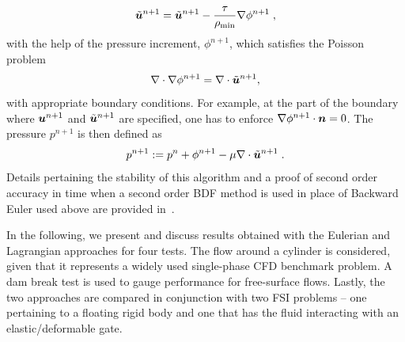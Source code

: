 \begin{align*}
\tilde{\boldsymbol{u}}^{n+1} = \tilde{\boldsymbol{u}}^{n+1} - \frac{\tau}{\rho_{\min}}\nabla\phi^{n+1} \; ,
\end{align*}
with the help of the pressure increment, $\phi^{n+1}$, which satisfies the Poisson problem 
\begin{align*}
\nabla\cdot\nabla\phi^{n+1} = \nabla\cdot\tilde{\boldsymbol{u}}^{n+1} ,
\end{align*}
with appropriate boundary conditions. For example, at the part of the boundary where $\boldsymbol{u}^{n+1}$ and 
$\tilde{\boldsymbol{u}}^{n+1}$ are specified, one has to enforce $\nabla\phi^{n+1}\cdot\boldsymbol{n}=0$.
The pressure $p^{n+1}$ is then defined as 
\begin{align*}
p^{n+1} := p^n + \phi^{n+1} - \mu \nabla\cdot\tilde{\boldsymbol{u}}^{n+1} \; .
\end{align*}
Details pertaining the stability of this algorithm and a proof of second order accuracy in time when a second order BDF method is used in place of Backward
Euler used above are provided in~\cite{GS09}. 

In the following, we present and discuss results obtained with the Eulerian and Lagrangian approaches for four tests. The flow around a cylinder is considered, given that it represents a widely used single-phase CFD benchmark problem. A dam break test is used to gauge performance for free-surface flows. Lastly, the two approaches are compared in conjunction with two FSI problems -- one pertaining to a floating rigid body and one that has the fluid interacting with an elastic/deformable gate. 

